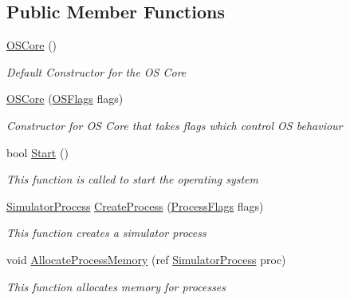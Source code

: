 \subsection*{Public Member Functions}
\begin{DoxyCompactItemize}
\item 
\hyperlink{class_c_p_u___o_s___simulator_1_1_operating___system_1_1_o_s_core_a3845ed83851b87e64d6918a2a495e45e}{O\+S\+Core} ()
\begin{DoxyCompactList}\small\item\em Default Constructor for the O\+S Core \end{DoxyCompactList}\item 
\hyperlink{class_c_p_u___o_s___simulator_1_1_operating___system_1_1_o_s_core_a65c809ada2e4d0d5f6269e6a9009db0d}{O\+S\+Core} (\hyperlink{struct_c_p_u___o_s___simulator_1_1_operating___system_1_1_o_s_flags}{O\+S\+Flags} flags)
\begin{DoxyCompactList}\small\item\em Constructor for O\+S Core that takes flags which control O\+S behaviour \end{DoxyCompactList}\item 
bool \hyperlink{class_c_p_u___o_s___simulator_1_1_operating___system_1_1_o_s_core_adb8186aefcc47d02daa0856e5c9c42b7}{Start} ()
\begin{DoxyCompactList}\small\item\em This function is called to start the operating system \end{DoxyCompactList}\item 
\hyperlink{class_c_p_u___o_s___simulator_1_1_operating___system_1_1_simulator_process}{Simulator\+Process} \hyperlink{class_c_p_u___o_s___simulator_1_1_operating___system_1_1_o_s_core_afee9dd12629e415c420fc7c197f784c4}{Create\+Process} (\hyperlink{struct_c_p_u___o_s___simulator_1_1_operating___system_1_1_process_flags}{Process\+Flags} flags)
\begin{DoxyCompactList}\small\item\em This function creates a simulator process \end{DoxyCompactList}\item 
void \hyperlink{class_c_p_u___o_s___simulator_1_1_operating___system_1_1_o_s_core_aaca3eba12c3f4e774d0328e3d3402ae3}{Allocate\+Process\+Memory} (ref \hyperlink{class_c_p_u___o_s___simulator_1_1_operating___system_1_1_simulator_process}{Simulator\+Process} proc)
\begin{DoxyCompactList}\small\item\em This function allocates memory for processes \end{DoxyCompactList}\end{DoxyCompactItemize}
